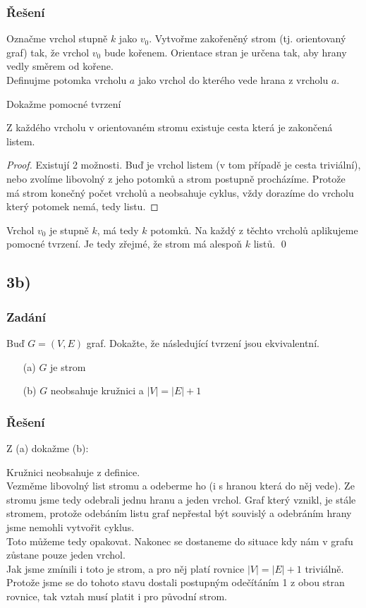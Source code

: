 \documentclass[../main.tex]{subfiles}
\begin{document}
\subsubsection*{Řešení}

Označme vrchol stupně $k$ jako $v_0$. Vytvořme zakořeněný strom (tj. orientovaný graf) tak, že vrchol $v_0$ bude kořenem. 
Orientace stran je určena tak, aby hrany vedly směrem od kořene. \\
Definujme potomka vrcholu $a$ jako vrchol do kterého vede hrana z vrcholu $a$.

Dokažme pomocné tvrzení
\begin{lemma*}
    Z každého vrcholu v orientovaném stromu existuje cesta která je zakončená listem.
\end{lemma*}
\begin{proof}
    Existují 2 možnosti. Buď je vrchol listem (v tom případě je cesta triviální), 
    nebo zvolíme libovolný z jeho potomků a strom postupně procházíme.
    Protože má strom konečný počet vrcholů a neobsahuje cyklus, 
    vždy dorazíme do vrcholu který potomek nemá, tedy listu. 
\end{proof}

Vrchol $v_0$ je stupně $k$, má tedy $k$ potomků. Na každý z těchto vrcholů aplikujeme pomocné tvrzení.
Je tedy zřejmé, že strom má alespoň $k$ listů. \qed


\subsection{3b)}
\subsubsection*{Zadání}
Buď $G=(V,E)$ graf. Dokažte, že následující tvrzení jsou ekvivalentní.
\begin{enumerate}
    \item[(a)] $G$ je strom
    \item[(b)] $G$ neobsahuje kružnici a $|V| = |E| + 1$
\end{enumerate}

\subsubsection*{Řešení}

Z (a) dokažme (b):

Kružnici neobsahuje z definice.\\
Vezměme libovolný list stromu a odeberme ho (i s hranou která do něj vede).
Ze stromu jsme tedy odebrali jednu hranu a jeden vrchol. Graf který vznikl,
je stále stromem, protože odebáním listu graf nepřestal být souvislý a odebráním hrany jsme nemohli vytvořit cyklus.\\
Toto můžeme tedy opakovat. Nakonec se dostaneme do situace kdy nám v grafu zůstane pouze jeden vrchol.\\
Jak jsme zmínili i toto je strom, a pro něj platí rovnice $|V|=|E|+1$ triviálně.
Protože jsme se do tohoto stavu dostali postupným odečítáním 1 z obou stran rovnice, tak vztah musí platit i pro původní strom.
\end{document}
